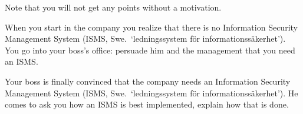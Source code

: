 \documentclass[a4paper,addpoints]{exam}
\begin{document}
\begin{questions}
  Note that you will not get any points without a motivation.


  \question[5]\label{q:msb:E:C}
  When you start in the company you realize that there is no Information 
  Security Management System (ISMS, Swe.~`ledningssystem för 
  informationssäkerhet').
  You go into your boss's office: persuade him and the management that you need 
  an ISMS\@.


  \question[5]\label{q:msb:E:C}
  Your boss is finally convinced that the company needs an Information Security 
  Management System (ISMS, Swe.~`ledningssystem för informationssäkerhet').
  He comes to ask you how an ISMS is best implemented, explain how that is 
  done.



\end{questions}
\end{document}
